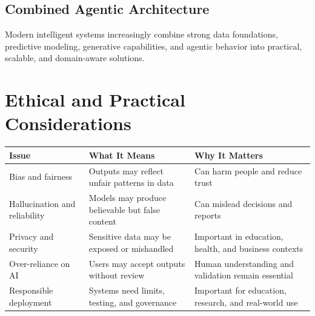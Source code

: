 \documentclass[11pt,a4paper]{article}
\begin{document}
\subsection{Combined Agentic Architecture}

\begin{center}
\end{center}

\begin{conceptbox}
Modern intelligent systems increasingly combine strong data foundations, predictive modeling, generative capabilities, and agentic behavior into practical, scalable, and domain-aware solutions.
\end{conceptbox}

\section{Ethical and Practical Considerations}

\begin{longtable}{@{}p{3.2cm}p{4.1cm}p{5.9cm}@{}}
\toprule
\rowcolor{primary!15}
\textbf{Issue} & \textbf{What It Means} & \textbf{Why It Matters} \\
\midrule
\endhead
Bias and fairness & Outputs may reflect unfair patterns in data & Can harm people and reduce trust \\
\addlinespace
Hallucination and reliability & Models may produce believable but false content & Can mislead decisions and reports \\
\addlinespace
Privacy and security & Sensitive data may be exposed or mishandled & Important in education, health, and business contexts \\
\addlinespace
Over-reliance on AI & Users may accept outputs without review & Human understanding and validation remain essential \\
\addlinespace
Responsible deployment & Systems need limits, testing, and governance & Important for education, research, and real-world use \\
\bottomrule
\end{longtable}
\end{document}
